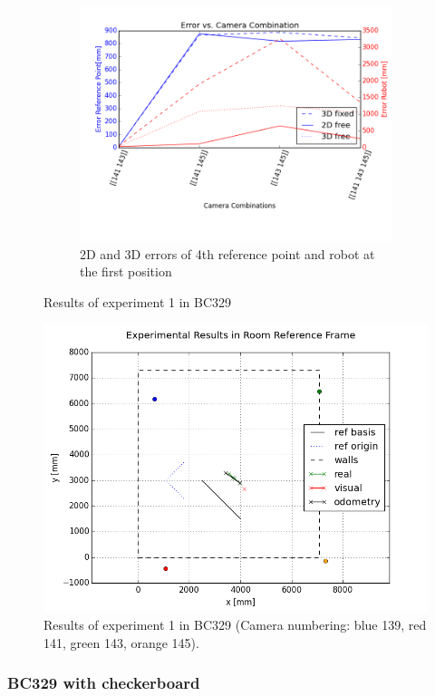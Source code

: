 \begin{figure}[H]
\begin{subfigure}{0.7\linewidth}
        \includegraphics[width=\linewidth]{files/res1_combi_4.png}
        \caption{2D and 3D errors of 4th reference point and robot at the first position}
        \label{fig:res1_combi}
    \end{subfigure}
    \caption{Results of experiment 1 in BC329}
    \label{fig:experiment1}
\end{figure}

\begin{figure}[H]
    \centering
    \includegraphics[width=.9\linewidth]{files/res1_room.png}
    \caption{Results of experiment 1 in BC329 (Camera numbering: blue 139, red 141, green 143, orange 145).}
    \label{fig:res1_room}
\end{figure}


\subsubsection{BC329 with checkerboard}

